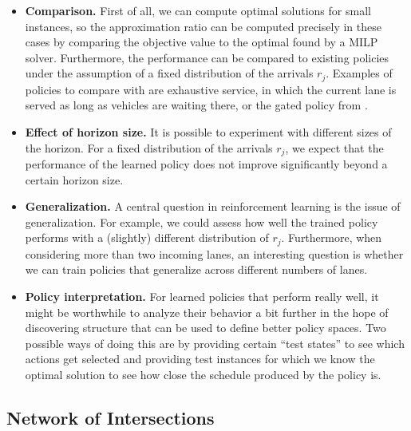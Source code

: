 \documentclass{article}
\begin{document}
\begin{itemize}

  \item \textbf{Comparison.} First of all, we can compute optimal solutions for
        small instances, so the approximation ratio can be computed precisely in
        these cases by comparing the objective value to the optimal found by a
        MILP solver. Furthermore, the performance can be compared to existing
        policies under the assumption of a fixed distribution of the arrivals
        $r_j$. Examples of policies to compare with are exhaustive service, in
        which the current lane is served as long as vehicles are waiting there,
        or the gated policy from \cite{timmerman_platoon_2021}.

  \item \textbf{Effect of horizon size.} It is possible to experiment with
        different sizes of the horizon. For a fixed distribution of the arrivals
        $r_j$, we expect that the performance of the learned policy does not
        improve significantly beyond a certain horizon size.

  \item \textbf{Generalization.} A central question in reinforcement learning is
        the issue of generalization. For example, we could assess how well the
        trained policy performs with a (slightly) different distribution of
        $r_j$. Furthermore, when considering more than two incoming lanes, an
        interesting question is whether we can train policies that generalize
        across different numbers of lanes.

  \item \textbf{Policy interpretation.} For learned policies that perform really
        well, it might be worthwhile to analyze their behavior a bit further in
        the hope of discovering structure that can be used to define better
        policy spaces. Two possible ways of doing this are by providing certain
        ``test states'' to see which actions get selected and providing test
        instances for which we know the optimal solution to see how close the
        schedule produced by the policy is.

\end{itemize}


\subsection{Network of Intersections}
\end{document}
